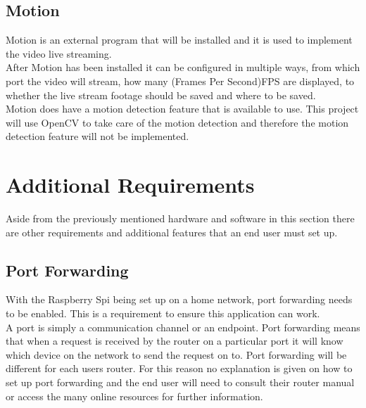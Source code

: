 \documentclass[12pt]{report}
\begin{document}
\noindent
\subsection{Motion}
\label{subsec:motion}
Motion is an external program that will be installed and it is used to implement the video live streaming.\\

After Motion has been installed it can be configured in multiple ways, from which port the video will stream, how many (Frames Per Second)FPS are displayed, to whether the live stream footage should be saved and where to be saved.\\

Motion does have a motion detection feature that is available to use. This project will use OpenCV to take care of the motion detection and therefore the motion detection feature will not be implemented.\\

\clearpage
\section{Additional Requirements}	
\label{sec:additional}
Aside from the previously mentioned hardware and software in this section there are other requirements and additional features that an end user must set up.\\

\noindent
\subsection{Port Forwarding}
\label{subsec:portfwd}
With the Raspberry Spi being set up on a home network, port forwarding needs to be enabled. This is a requirement to ensure this application can work.\\

A port is simply a communication channel or an endpoint. Port forwarding means that when a request is received by the router on a particular port it will know which device on the network to send the request on to. Port forwarding will be different for each users router. For this reason no explanation is given on how to set up port forwarding and the end user will need to consult their router manual or access the many online resources for further information.\\
\end{document}
